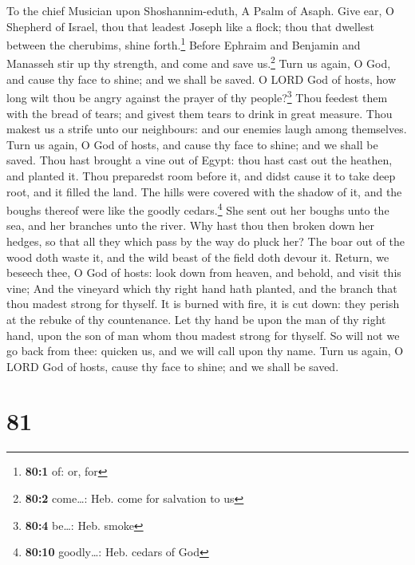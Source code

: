 To the chief Musician upon Shoshannim-eduth, A Psalm of Asaph.
 Give ear, O Shepherd of Israel, thou that leadest Joseph
like a flock; thou that dwellest between the cherubims, shine
forth.\footnote{\textbf{80:1} of: or, for}  Before Ephraim
and Benjamin and Manasseh stir up thy strength, and come and save
us.\footnote{\textbf{80:2} come\ldots: Heb. come for salvation to us}
 Turn us again, O God, and cause thy face to shine; and we
shall be saved.  O LORD God of hosts, how long wilt thou
be angry against the prayer of thy people?\footnote{\textbf{80:4}
  be\ldots: Heb. smoke}  Thou feedest them with the bread
of tears; and givest them tears to drink in great measure.
 Thou makest us a strife unto our neighbours: and our
enemies laugh among themselves.  Turn us again, O God of
hosts, and cause thy face to shine; and we shall be saved.
 Thou hast brought a vine out of Egypt: thou hast cast out
the heathen, and planted it.  Thou preparedst room before
it, and didst cause it to take deep root, and it filled the land.
 The hills were covered with the shadow of it, and the
boughs thereof were like the goodly cedars.\footnote{\textbf{80:10}
  goodly\ldots: Heb. cedars of God}  She sent out her
boughs unto the sea, and her branches unto the river. 
Why hast thou then broken down her hedges, so that all they which pass
by the way do pluck her?  The boar out of the wood doth
waste it, and the wild beast of the field doth devour it.
 Return, we beseech thee, O God of hosts: look down from
heaven, and behold, and visit this vine;  And the
vineyard which thy right hand hath planted, and the branch that thou
madest strong for thyself.  It is burned with fire, it is
cut down: they perish at the rebuke of thy countenance. 
Let thy hand be upon the man of thy right hand, upon the son of man whom
thou madest strong for thyself.  So will not we go back
from thee: quicken us, and we will call upon thy name. 
Turn us again, O LORD God of hosts, cause thy face to shine; and we
shall be saved.

\hypertarget{section-80}{%
\section{81}\label{section-80}}

